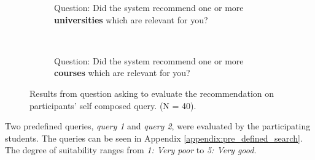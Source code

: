 \begin{figure}[H]
    \centering
    \begin{subfigure}[b]{0.4\textwidth}
        
        \caption{Question: Did the system recommend one or more \textbf{universities} which are relevant for you?}
        \label{fig:free_search_results_p1}
    \end{subfigure}
    ~ \qquad %
    \begin{subfigure}[b]{0.4\textwidth}
       
        \caption{Question: Did the system recommend one or more \textbf{courses} which are relevant for you?}
        \label{fig:free_search_results_p2}
    \end{subfigure}
    \caption[Result from evaluation of recommendation]{Results from question asking to evaluate the recommendation on participants' self composed query. (N = 40).}
    \label{fig:free_search_results}
\end{figure}

Two predefined queries, \textit{query 1} and \textit{query 2}, were evaluated by the participating students. The queries can be seen in Appendix \ref{appendix:pre_defined_search}. The degree of suitability ranges from \textit{1: Very poor} to \textit{5: Very good}.

